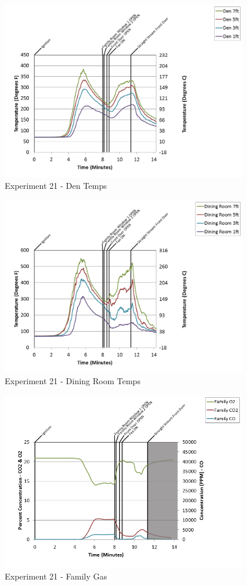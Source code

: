 \documentclass{article}
\begin{document}
\begin{appendices}
\begin{figure}[h!]
	\centering
	\includegraphics[height=3.05in]{0_Images/Results_Charts/Exp_21_Charts/DenTemps.png}
	\caption{Experiment 21 - Den Temps}
\end{figure}

\clearpage

\begin{figure}[h!]
	\centering
	\includegraphics[height=3.05in]{0_Images/Results_Charts/Exp_21_Charts/DiningRoomTemps.png}
	\caption{Experiment 21 - Dining Room Temps}
\end{figure}


\begin{figure}[h!]
	\centering
	\includegraphics[height=3.05in]{0_Images/Results_Charts/Exp_21_Charts/FamilyGas.png}
	\caption{Experiment 21 - Family Gas}
\end{figure}


\end{appendices}
\end{document}
